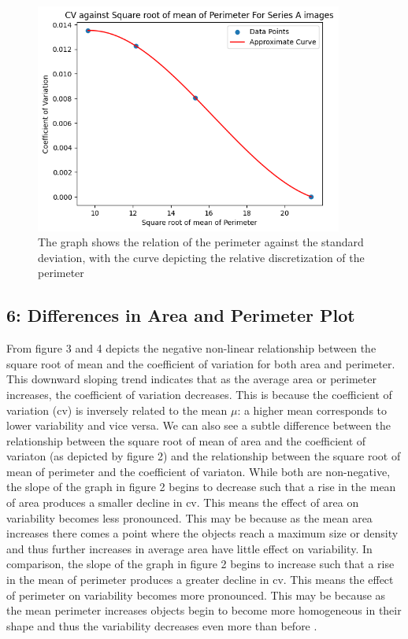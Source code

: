\documentclass[runningheads]{llncs}
\begin{document}
\begin{figure}[h!]
\centering
\includegraphics[width=0.9\textwidth]{Report/Result_Images/2.2_perimeter.png}
\caption{The graph shows the relation of the perimeter against the standard deviation, with the curve depicting the relative discretization of the perimeter} 
\label{perimeter-relation-A}
\end{figure}


\subsection*{6: Differences in Area and Perimeter Plot}

From figure 3 and 4 depicts the negative non-linear relationship between the square root of mean and the coefficient of variation for both area and perimeter. This downward sloping trend indicates that as the average area or perimeter increases, the coefficient of variation decreases. This is because the coefficient of variation (cv) is inversely related to the mean $\mu$: a higher mean corresponds to lower variability and vice versa. \newline
We can also see a subtle difference between the relationship between the square root of mean of area and the coefficient of variaton (as depicted by figure 2) and the relationship between  the square root of mean of perimeter and the coefficient of variaton. While both are non-negative, the slope of the graph in figure 2 begins to decrease such that a rise in the mean of area produces a smaller decline in cv. This means the effect of area on variability becomes less pronounced. This may be because as the mean area increases there comes a point where the objects reach a maximum size or density and thus further increases in average area have little effect on variability.\newline
In comparison, the slope of the graph in figure 2 begins to increase such that a rise in the mean of perimeter produces a greater decline in cv. This means the effect of perimeter on variability becomes more pronounced. This may be because as the mean perimeter increases objects begin to become more homogeneous in their shape and thus the variability decreases even more than before .
\newpage
\end{document}
